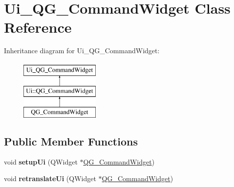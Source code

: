 \hypertarget{classUi__QG__CommandWidget}{\section{Ui\-\_\-\-Q\-G\-\_\-\-Command\-Widget Class Reference}
\label{classUi__QG__CommandWidget}
}
Inheritance diagram for Ui\-\_\-\-Q\-G\-\_\-\-Command\-Widget\-:\begin{figure}[H]
\begin{center}
\leavevmode
\includegraphics[height=3.000000cm]{classUi__QG__CommandWidget}
\end{center}
\end{figure}
\subsection*{Public Member Functions}
\begin{DoxyCompactItemize}
\item 
\hypertarget{classUi__QG__CommandWidget_a6ff44c133274dba4d2d209dfd14274ae}{void {\bfseries setup\-Ui} (Q\-Widget $\ast$\hyperlink{classQG__CommandWidget}{Q\-G\-\_\-\-Command\-Widget})}\label{classUi__QG__CommandWidget_a6ff44c133274dba4d2d209dfd14274ae}

\item 
\hypertarget{classUi__QG__CommandWidget_a53911c7132f86888407c6a05277347ec}{void {\bfseries retranslate\-Ui} (Q\-Widget $\ast$\hyperlink{classQG__CommandWidget}{Q\-G\-\_\-\-Command\-Widget})}\label{classUi__QG__CommandWidget_a53911c7132f86888407c6a05277347ec}

\end{DoxyCompactItemize}
